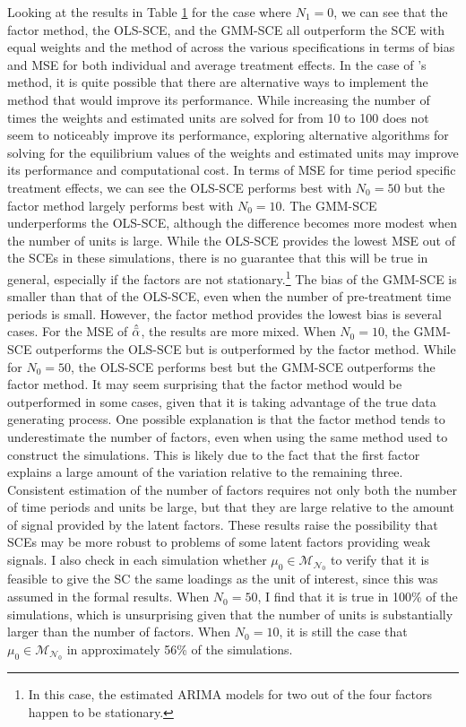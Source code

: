 \documentclass{article}
\begin{document}
Looking at the results in Table \hyperref[Table1]{1} for the case where $N_1 = 0$, we can see that the factor method, the OLS-SCE, and the GMM-SCE all outperform the SCE with equal weights and the method of \cite{Powell2021} across the various specifications in terms of bias and MSE for both individual and average treatment effects. In the case of \cite{Powell2021}'s method, it is quite possible that there are alternative ways to implement the method that would improve its performance. While increasing the number of times the weights and estimated units are solved for from 10 to 100 does not seem to noticeably improve its performance, exploring alternative algorithms for solving for the equilibrium values of the weights and estimated units may improve its performance and computational cost. In terms of MSE for time period specific treatment effects, we can see the OLS-SCE performs best with $N_0 = 50$ but the factor method largely performs best with $N_0 = 10$. The GMM-SCE underperforms the OLS-SCE, although the difference becomes more modest when the number of units is large. While the OLS-SCE provides the lowest MSE out of the SCEs in these simulations, there is no guarantee that this will be true in general, especially if the factors are not stationary.\footnote{In this case, the estimated ARIMA models for two out of the four factors happen to be stationary.} The bias of the GMM-SCE is smaller than that of the OLS-SCE, even when the number of pre-treatment time periods is small. However, the factor method provides the lowest bias is several cases. For the MSE of $\hat{\Bar{\alpha}}$, the results are more mixed. When $N_0 = 10$, the GMM-SCE outperforms the OLS-SCE but is outperformed by the factor method. While for $N_0 = 50$, the OLS-SCE performs best but the GMM-SCE outperforms the factor method. It may seem surprising that the factor method would be outperformed in some cases, given that it is taking advantage of the true data generating process. One possible explanation is that the factor method tends to underestimate the number of factors, even when using the same method used to construct the simulations. This is likely due to the fact that the first factor explains a large amount of the variation relative to the remaining three. Consistent estimation of the number of factors requires not only both the number of time periods and units be large, but that they are large relative to the amount of signal provided by the latent factors. These results raise the possibility that SCEs may be more robust to problems of some latent factors providing weak signals. I also check in each simulation whether $\mu_0 \in \mathcal{M}_{\mathcal{N}_0}$ to verify that it is feasible to give the SC the same loadings as the unit of interest, since this was assumed in the formal results. When $N_0 = 50$, I find that it is true in 100\% of the simulations, which is unsurprising given that the number of units is substantially larger than the number of factors. When $N_0 = 10$, it is still the case that $\mu_0 \in \mathcal{M}_{\mathcal{N}_0}$ in approximately 56\% of the simulations. 
\end{document}
